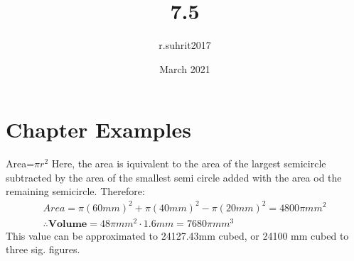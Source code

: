 \documentclass{article}
\title{7.5}
\author{r.suhrit2017 }
\date{March 2021}
\begin{document}
    
\maketitle
    
\section{Chapter Examples}
Area=$\pi r^2$
Here, the area is iquivalent to the area of the largest semicircle subtracted by the area of the smallest semi circle added with the area od the remaining semicircle. Therefore:
\begin{gather*}
Area=\pi (60mm)^2+\pi (40mm)^2-\pi (20mm)^2=4800\pi mm^2
\\\therefore \textbf{Volume}=48\pi mm^2 \cdot 1.6mm= 7680\pi mm^3
\end{gather*}
This value can be approximated to 24127.43mm cubed, or 24100 mm cubed to three sig. figures.
\end{document}
